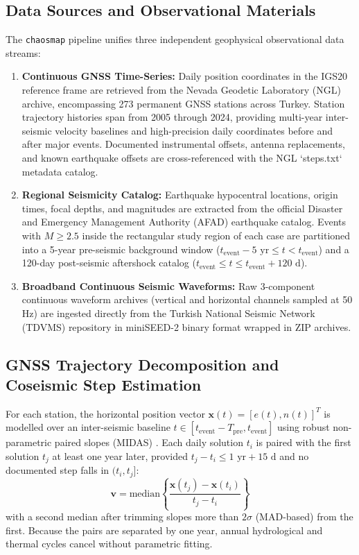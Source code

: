 \documentclass[11pt,a4paper]{article}
\begin{document}
\subsection{Data Sources and Observational Materials}
The \texttt{chaosmap} pipeline unifies three independent geophysical observational data streams:
\begin{enumerate}
    \item \textbf{Continuous GNSS Time-Series:} Daily position coordinates in the IGS20 reference frame are retrieved from the Nevada Geodetic Laboratory (NGL) archive, encompassing 273 permanent GNSS stations across Turkey. Station trajectory histories span from 2005 through 2024, providing multi-year inter-seismic velocity baselines and high-precision daily coordinates before and after major events. Documented instrumental offsets, antenna replacements, and known earthquake offsets are cross-referenced with the NGL `steps.txt` metadata catalog.
    \item \textbf{Regional Seismicity Catalog:} Earthquake hypocentral locations, origin times, focal depths, and magnitudes are extracted from the official Disaster and Emergency Management Authority (AFAD) earthquake catalog. Events with $M \ge 2.5$ inside the rectangular study region of each case are partitioned into a 5-year pre-seismic background window ($t_{\text{event}} - 5\text{ yr} \le t < t_{\text{event}}$) and a 120-day post-seismic aftershock catalog ($t_{\text{event}} \le t \le t_{\text{event}} + 120\text{ d}$).
    \item \textbf{Broadband Continuous Seismic Waveforms:} Raw 3-component continuous waveform archives (vertical and horizontal channels sampled at 50 Hz) are ingested directly from the Turkish National Seismic Network (TDVMS) repository in miniSEED-2 binary format wrapped in ZIP archives.
\end{enumerate}

\subsection{GNSS Trajectory Decomposition and Coseismic Step Estimation}
For each station, the horizontal position vector $\mathbf{x}(t) = [e(t), n(t)]^T$ is modelled over an inter-seismic baseline $t \in [t_{\text{event}} - T_{\text{pre}}, t_{\text{event}}]$ using robust non-parametric paired slopes (MIDAS) \cite{blewitt2016}. Each daily solution $t_i$ is paired with the first solution $t_j$ at least one year later, provided $t_j - t_i \le 1\text{ yr} + 15\text{ d}$ and no documented step falls in $(t_i, t_j]$:
\begin{equation}
\mathbf{v} = \text{median}\left\{ \frac{\mathbf{x}(t_j) - \mathbf{x}(t_i)}{t_j - t_i} \right\}
\end{equation}
with a second median after trimming slopes more than $2\sigma$ (MAD-based) from the first. Because the pairs are separated by one year, annual hydrological and thermal cycles cancel without parametric fitting.
\end{document}
